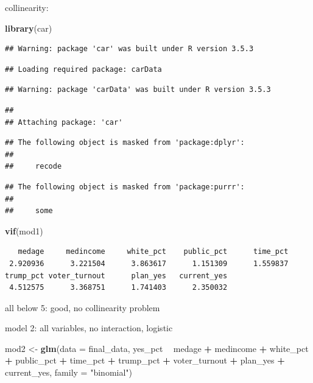 \documentclass[
]{article}
\newenvironment{Shaded}{\begin{snugshade}}{\end{snugshade}}
\newcommand{\DataTypeTok}[1]{\textcolor[rgb]{0.13,0.29,0.53}{#1}}
\newcommand{\KeywordTok}[1]{\textcolor[rgb]{0.13,0.29,0.53}{\textbf{#1}}}
\newcommand{\NormalTok}[1]{#1}
\newcommand{\OperatorTok}[1]{\textcolor[rgb]{0.81,0.36,0.00}{\textbf{#1}}}
\newcommand{\StringTok}[1]{\textcolor[rgb]{0.31,0.60,0.02}{#1}}
\begin{document}
collinearity:

\begin{Shaded}
\begin{Highlighting}[]
\KeywordTok{library}\NormalTok{(car)}
\end{Highlighting}
\end{Shaded}

\begin{verbatim}
## Warning: package 'car' was built under R version 3.5.3
\end{verbatim}

\begin{verbatim}
## Loading required package: carData
\end{verbatim}

\begin{verbatim}
## Warning: package 'carData' was built under R version 3.5.3
\end{verbatim}

\begin{verbatim}
## 
## Attaching package: 'car'
\end{verbatim}

\begin{verbatim}
## The following object is masked from 'package:dplyr':
## 
##     recode
\end{verbatim}

\begin{verbatim}
## The following object is masked from 'package:purrr':
## 
##     some
\end{verbatim}

\begin{Shaded}
\begin{Highlighting}[]
\KeywordTok{vif}\NormalTok{(mod1)}
\end{Highlighting}
\end{Shaded}

\begin{verbatim}
   medage     medincome     white_pct    public_pct      time_pct 
 2.920936      3.221504      3.863617      1.151309      1.559837 
trump_pct voter_turnout      plan_yes   current_yes 
 4.512575      3.368751      1.741403      2.350032 
\end{verbatim}

all below 5: good, no collinearity problem

model 2: all variables, no interaction, logistic

\begin{Shaded}
\begin{Highlighting}[]
\NormalTok{mod2 <-}\StringTok{ }\KeywordTok{glm}\NormalTok{(}\DataTypeTok{data =}\NormalTok{ final_data, yes_pct }\OperatorTok{~}\StringTok{ }\NormalTok{medage }\OperatorTok{+}\StringTok{ }\NormalTok{medincome }\OperatorTok{+}\StringTok{ }\NormalTok{white_pct }\OperatorTok{+}\StringTok{ }\NormalTok{public_pct }\OperatorTok{+}\StringTok{ }\NormalTok{time_pct }\OperatorTok{+}\StringTok{ }\NormalTok{trump_pct }\OperatorTok{+}\StringTok{ }\NormalTok{voter_turnout }\OperatorTok{+}\StringTok{ }\NormalTok{plan_yes }\OperatorTok{+}\StringTok{ }\NormalTok{current_yes, }\DataTypeTok{family =} \StringTok{"binomial"}\NormalTok{)}
\end{Highlighting}
\end{Shaded}
\end{document}
